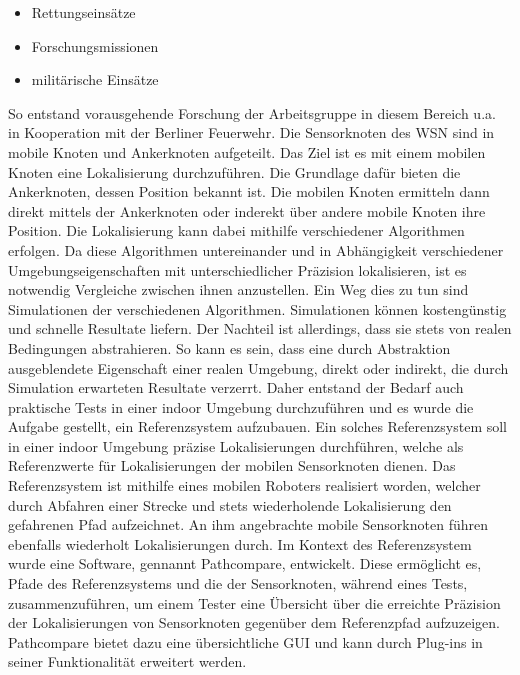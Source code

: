 \begin{itemize}
  \item Rettungseinsätze 
  \item Forschungsmissionen
  \item militärische Einsätze
\end{itemize}

So entstand vorausgehende Forschung der Arbeitsgruppe in diesem Bereich u.a. in
Kooperation mit der Berliner Feuerwehr. Die Sensorknoten des WSN sind in mobile
Knoten und Ankerknoten aufgeteilt. Das Ziel ist es mit einem mobilen Knoten
eine Lokalisierung durchzuführen. Die Grundlage dafür bieten die Ankerknoten,
dessen Position bekannt ist. Die mobilen Knoten ermitteln dann direkt mittels
der Ankerknoten oder inderekt über andere mobile Knoten ihre Position. Die
Lokalisierung kann dabei mithilfe verschiedener Algorithmen erfolgen. Da diese
Algorithmen untereinander und in Abhängigkeit verschiedener
Umgebungseigenschaften mit unterschiedlicher Präzision lokalisieren, ist es
notwendig Vergleiche zwischen ihnen anzustellen. Ein Weg dies zu tun sind
Simulationen der verschiedenen Algorithmen. Simulationen können kostengünstig
und schnelle Resultate liefern. Der Nachteil ist allerdings, dass sie stets
von realen Bedingungen abstrahieren. So kann es sein, dass eine durch
Abstraktion ausgeblendete Eigenschaft einer realen Umgebung, direkt oder
indirekt, die durch Simulation erwarteten Resultate verzerrt. Daher entstand
der Bedarf auch praktische Tests in einer indoor Umgebung durchzuführen und es
wurde die Aufgabe gestellt, ein Referenzsystem aufzubauen. Ein solches
Referenzsystem soll in einer indoor Umgebung präzise Lokalisierungen
durchführen, welche als Referenzwerte für Lokalisierungen der mobilen
Sensorknoten dienen. Das Referenzsystem ist mithilfe eines mobilen Roboters
realisiert worden, welcher durch Abfahren einer Strecke und stets wiederholende
Lokalisierung den gefahrenen Pfad aufzeichnet.  An ihm angebrachte mobile
Sensorknoten führen ebenfalls wiederholt Lokalisierungen durch. Im Kontext des
Referenzsystem wurde eine Software, gennannt Pathcompare, entwickelt.  Diese
ermöglicht es, Pfade des Referenzsystems und die der Sensorknoten, während
eines Tests, zusammenzuführen, um einem Tester eine Übersicht über die
erreichte Präzision der Lokalisierungen von Sensorknoten gegenüber dem
Referenzpfad aufzuzeigen. Pathcompare bietet dazu eine übersichtliche GUI und
kann durch Plug-ins in seiner Funktionalität erweitert werden.

